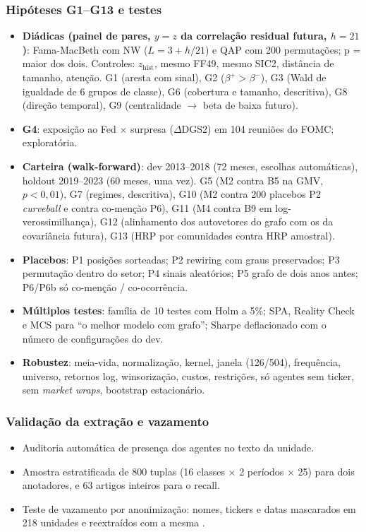 \documentclass[11pt,a4paper]{article}
\begin{document}
\subsubsection*{Hipóteses G1--G13 e testes}
\begin{itemize}
  \item \textbf{Diádicas (painel de pares, $y=z$ da correlação residual futura, $h=21$)}: Fama-MacBeth com NW
        ($L=3+h/21$) e QAP com 200 permutações; p = maior dos dois. Controles: $z_{\text{hist}}$, mesmo FF49,
        mesmo SIC2, distância de tamanho, atenção. G1 (aresta com sinal), G2 ($\beta^+>\beta^-$), G3
        (Wald de igualdade de 6 grupos de classe), G6 (cobertura e tamanho, descritiva), G8 (direção
        temporal), G9 (centralidade $\to$ beta de baixa futuro).
  \item \textbf{G4}: exposição ao Fed $\times$ surpresa ($\Delta$DGS2) em 104 reuniões do FOMC; exploratória.
  \item \textbf{Carteira (walk-forward)}: dev 2013--2018 (72 meses, escolhas automáticas), holdout 2019--2023
        (60 meses, uma vez). G5 (M2 contra B5 na GMV, $p<0{,}01$), G7 (regimes, descritiva), G10
        (M2 contra 200 placebos P2 \emph{curveball} e contra co-menção P6), G11 (M4 contra B9 em
        log-verossimilhança), G12 (alinhamento dos autovetores do grafo com os da covariância futura),
        G13 (HRP por comunidades contra HRP amostral).
  \item \textbf{Placebos}: P1 posições sorteadas; P2 rewiring com graus preservados; P3 permutação dentro
        do setor; P4 sinais aleatórios; P5 grafo de dois anos antes; P6/P6b só co-menção / co-ocorrência.
  \item \textbf{Múltiplos testes}: família de 10 testes com Holm a 5\%; SPA, Reality Check e MCS para
        ``o melhor modelo com grafo''; Sharpe deflacionado com o número de configurações do dev.
  \item \textbf{Robustez}: meia-vida, normalização, kernel, janela (126/504), frequência, universo, retornos log,
        winsorização, custos, restrições, só agentes sem ticker, sem \emph{market wraps}, bootstrap estacionário.
\end{itemize}

\subsubsection*{Validação da extração e vazamento}
\begin{itemize}
  \item Auditoria automática de presença dos agentes no texto da unidade.
  \item Amostra estratificada de 800 tuplas (16 classes $\times$ 2 períodos $\times$ 25) para dois anotadores,
        e 63 artigos inteiros para o recall.
  \item Teste de vazamento por anonimização: nomes, tickers e datas mascarados em 218 unidades e
        reextraídos com a mesma .
\end{itemize}
\end{document}
